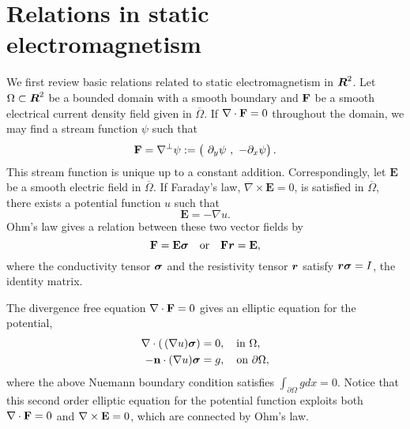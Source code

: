 \documentclass[11pt]{amsart}
\theoremstyle{plain}
\numberwithin{equation}{section}
\numberwithin{Thm}{section}
\def\R{\mbox{\boldmath$R$}}
\def\F{{\bf F}}
\def\E{{\bf E}}
\def\r{{\bf r}}
\def\n{{\bf n}}
\def\Sigma{\mbox{\boldmath$\sigma$}}
\def\r{\mbox{\boldmath$r$}}
\begin{document}
\section{Relations in static electromagnetism}
We first review basic relations related to static electromagnetism in $\R^2$. Let $\Omega\subset \R^2 $ be a bounded domain with a smooth boundary and $\F$ be a smooth electrical current density field given in $\overline\Omega$. If $\nabla\cdot\F=0$ throughout the domain, we may find a stream function $\psi$ such that
$$
\F=\nabla^\perp\psi:= \begin{pmatrix}\ \partial_y \psi~,~ -\partial_x \psi \end{pmatrix}.
$$
This stream function is unique up to a constant addition. Correspondingly, let $\mathbf{E}$ be a smooth electric field in $\overline\Omega$. If Faraday's law, $\nabla\times \mathbf{E} = 0$, is satisfied in $\overline\Omega$, there exists a potential function $u$ such that
$$ \mathbf{E} = -\nabla u.$$
Ohm's law gives a relation between these two vector fields by
\begin{equation}
\F= \E\Sigma \quad \text{or} \quad\F\r=\E, \label{eqn:OhmsLaw0}
\end{equation}
where the conductivity tensor $\Sigma$ and the resistivity tensor $\r$ satisfy $\r\Sigma =I$, the identity matrix.

The divergence free equation $\nabla\cdot\F=0$ gives an elliptic equation for the potential,
\begin{align}
\nabla\cdot(\,(\nabla u)\Sigma)  &=0, \quad \text{in $\Omega$},\\
-\n\cdot(\nabla u)\Sigma&=g, \quad \text{on $\partial\Omega$},\label{Nuemann}
\end{align}
where the above Nuemann boundary condition satisfies $\int_{\partial\Omega}gdx=0$. Notice that this second order elliptic equation for the potential function exploits both $\nabla\cdot\F=0$ and $\nabla\times\E=0$, which are connected by Ohm's law.
\end{document}
